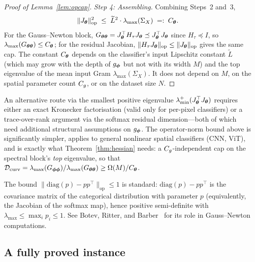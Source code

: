 \begin{proof}[Proof of Lemma~\ref{lem:opcap}]
\emph{Step 4: Assembling.}
Combining Steps~2 and~3,
\[
    \|J_{\boldsymbol{\theta}}\|_{\mathrm{op}}^{2}
    \;\leq\; \widetilde{L}^{2} \cdot \lambda_{\max}(\Sigma_X)
    \;=:\; C_{\boldsymbol{\theta}} .
\]
For the Gauss--Newton block, $G_{{\boldsymbol{\theta}}{\boldsymbol{\theta}}} = J_{\boldsymbol{\theta}}^\top H_\tau
J_{\boldsymbol{\theta}} \preceq J_{\boldsymbol{\theta}}^\top J_{\boldsymbol{\theta}}$ since $H_\tau \preceq I$, so
$\lambda_{\max}(G_{{\boldsymbol{\theta}}{\boldsymbol{\theta}}}) \leq C_{\boldsymbol{\theta}}$; for the residual
Jacobian, $\|H_\tau J_{\boldsymbol{\theta}}\|_{\mathrm{op}} \leq
\|J_{\boldsymbol{\theta}}\|_{\mathrm{op}}$ gives the same cap. The constant $C_{\boldsymbol{\theta}}$
depends on the classifier's input Lipschitz constant $\widetilde{L}$ (which
may grow with the depth of $g_{\boldsymbol{\phi}}$ but not with its width $M$) and the top
eigenvalue of the mean input Gram $\lambda_{\max}(\Sigma_X)$. It does not
depend on $M$, on the spatial parameter count $C_g$, or on the dataset size
$N$.
\end{proof}

\begin{remark}
\label{rem:opcap_route}
An alternative route via the smallest positive eigenvalue
$\lambda_{\min}^{+}(J_{\boldsymbol{\theta}}^\top J_{\boldsymbol{\theta}})$ requires either an exact
Kronecker factorisation (valid only for per-pixel classifiers) or a
trace-over-rank argument via the softmax residual dimension---both of which
need additional structural assumptions on $g_{\boldsymbol{\phi}}$. The operator-norm bound
above is significantly simpler, applies to general nonlinear spatial
classifiers (CNN, ViT), and is exactly what Theorem~\ref{thm:hessian} needs:
a $C_g$-independent cap on the spectral block's \emph{top} eigenvalue, so
that $\mathcal{D}_{\mathrm{curv}} = \lambda_{\max}(G_{{\boldsymbol{\phi}}{\boldsymbol{\phi}}})/
\lambda_{\max}(G_{{\boldsymbol{\theta}}{\boldsymbol{\theta}}}) \geq \Omega(M)/C_{\boldsymbol{\theta}}$.
\end{remark}

\begin{remark}
\label{rem:softmax_jac}
The bound $\|\mathrm{diag}(p) - p p^\top\|_{\mathrm{op}} \leq 1$ is
standard: $\mathrm{diag}(p) - p p^\top$ is the covariance matrix of the
categorical distribution with parameter $p$ (equivalently, the Jacobian of
the softmax map), hence positive semi-definite with
$\lambda_{\max} \leq \max_i p_i \leq 1$. See Botev, Ritter, and
Barber~\citep{botev2017practical} for its role in Gauss--Newton
computations.
\end{remark}

\subsection{A fully proved instance}
\label{app:instance}

